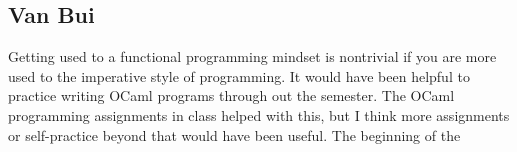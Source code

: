 \subsection{Van Bui}

Getting used to a functional programming mindset is nontrivial if you are more used to the imperative style of programming. It would have been helpful to practice writing OCaml programs through out the semester. The OCaml programming assignments in class helped with this, but I think more assignments or self-practice beyond that would have been useful. The beginning of the   
